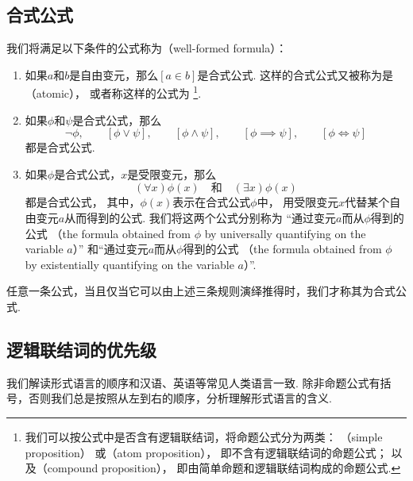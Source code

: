 \subsection{合式公式}
我们将满足以下条件的公式称为（well-formed formula）：%
\begin{enumerate}
	\item 如果\(a\)和\(b\)是自由变元，那么\([a \in b]\)是合式公式.
	这样的合式公式又被称为是（atomic），
	或者称这样的公式为
	\footnote{%
		我们可以按公式中是否含有逻辑联结词，将命题公式分为两类：
		（simple proposition）%
		或（atom proposition），
		即不含有逻辑联结词的命题公式；
		以及（compound proposition），
		即由简单命题和逻辑联结词构成的命题公式.
	}.

	\item 如果\(\phi\)和\(\psi\)是合式公式，那么\[
		\neg \phi, \qquad
		[\phi \lor \psi], \qquad
		[\phi \land \psi], \qquad
		[\phi \implies \psi], \qquad
		[\phi \iff \psi]
	\]都是合式公式.

	\item 如果\(\phi\)是合式公式，\(x\)是受限变元，那么\[
		(\forall x) \phi(x)
		\quad\text{和}\quad
		(\exists x) \phi(x)
	\]都是合式公式，
	其中，\(\phi(x)\)表示在合式公式\(\phi\)中，
	用受限变元\(x\)代替某个自由变元\(a\)从而得到的公式.
	我们将这两个公式分别称为%
	“通过变元\(a\)而从\(\phi\)得到的公式%
	（the formula obtained from \(\phi\) by universally quantifying on the variable \(a\)）”%
	和“通过变元\(a\)而从\(\phi\)得到的公式%
	（the formula obtained from \(\phi\) by existentially quantifying on the variable \(a\)）”.
\end{enumerate}
任意一条公式，当且仅当它可以由上述三条规则演绎推得时，我们才称其为合式公式.

\subsection{逻辑联结词的优先级}
我们解读形式语言的顺序和汉语、英语等常见人类语言一致.
除非命题公式有括号，否则我们总是按照从左到右的顺序，分析理解形式语言的含义.

